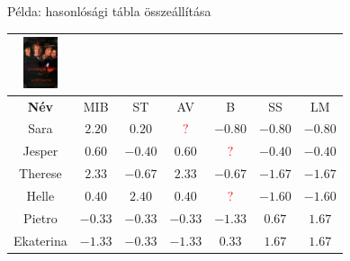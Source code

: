 \documentclass[english, aspectratio=169]{beamer}
\begin{document}
\begin{frame}{Példa: hasonlósági tábla összeállítása}
{\begin{center}
\begin{tabular}{|c|c|c|c|c|c|c|}
\includegraphics[height=1.5cm, keepaspectratio]{images/movies/les_miserables.png} \\
\hline
\textbf{Név} & MIB & ST & AV & B & SS & LM\\ 
\hline
Sara & $2.20$ & $0.20$ & \textcolor{red}{$?$} & $-0.80$ & $-0.80$ & $-0.80$\\ 
\hline
Jesper & $0.60$ & $-0.40$ & $0.60$ & \textcolor{red}{$?$} & $-0.40$ & $-0.40$\\ 
\hline
Therese & $2.33$ & $-0.67$ & $2.33$ & $-0.67$ & $-1.67$ & $-1.67$\\ 
\hline
Helle & $0.40$ & $2.40$ & $0.40$ & \textcolor{red}{$?$} & $-1.60$ & $-1.60$\\ 
\hline
Pietro & $-0.33$ & $-0.33$ & $-0.33$ & $-1.33$ & $0.67$ & $1.67$\\ 
\hline
Ekaterina & $-1.33$ & $-0.33$ & $-1.33$ & $0.33$ & $1.67$ & $1.67$\\ 
\hline
\end{tabular}
\end{center}}
\end{frame}
\end{document}
